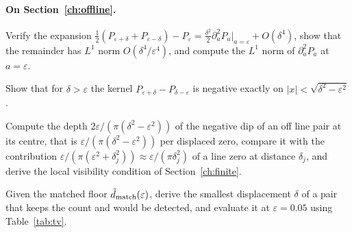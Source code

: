 \paragraph{On Section~\ref{ch:offline}.}
\begin{exercises}
\item Verify the expansion $\frac12(P_{\varepsilon+\delta}+P_{\varepsilon-\delta})-P_\varepsilon=\frac{\delta^2}2\partial_a^2P_a|_{a=\varepsilon}+O(\delta^4)$, show that the remainder has $L^1$ norm $O(\delta^4/\varepsilon^4)$, and compute the $L^1$ norm of $\partial_a^2P_a$ at $a=\varepsilon$.
\item Show that for $\delta>\varepsilon$ the kernel $P_{\varepsilon+\delta}-P_{\delta-\varepsilon}$ is negative exactly on $|x|<\sqrt{\delta^2-\varepsilon^2}$.
\item Compute the depth $2\varepsilon/(\pi(\delta^2-\varepsilon^2))$ of the negative dip of an off line pair at its centre, that is $\varepsilon/(\pi(\delta^2-\varepsilon^2))$ per displaced zero, compare it with the contribution $\varepsilon/(\pi(\varepsilon^2+\delta_j^2))\approx\varepsilon/(\pi\delta_j^2)$ of a line zero at distance $\delta_j$, and derive the local visibility condition of Section~\ref{ch:finite}.
\item Given the matched floor $\tilde d_{\rm match}(\varepsilon)$, derive the smallest displacement $\delta$ of a pair that keeps the count and would be detected, and evaluate it at $\varepsilon=0.05$ using Table~\ref{tab:tv}.
\end{exercises}

